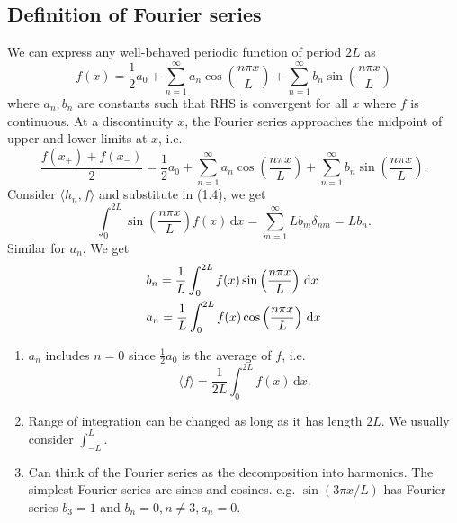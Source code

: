\documentclass[a4paper]{article}
\begin{document}
\subsection{Definition of Fourier series}
We can express any well-behaved periodic function of period $2L$ as 
\begin{equation}\label{1.eq.4:FS}
    f(x) = \frac{1}{2}a_0 + \sum_{n=1}^{\infty} a_n \cos \left( \frac{n\pi x}{L} \right)+ \sum_{n=1}^{\infty} b_n \sin \left( \frac{n\pi x}{L} \right)
\end{equation}
where $a_n,b_n$ are constants such that RHS is convergent for all $x$ where $f$ is continuous. At a discontinuity $x$, the Fourier series approaches the midpoint of upper and lower limits at $x$, i.e. 
\[
    \frac{f(x_+)+f(x_-)}{2} = \frac{1}{2}a_0 + \sum_{n=1}^{\infty} a_n \cos \left( \frac{n\pi x}{L} \right)+ \sum_{n=1}^{\infty} b_n \sin \left( \frac{n\pi x}{L} \right).
\]
Consider $ \langle h_n,f \rangle  $ and substitute in (1.4), we get 
\[
    \int_{0}^{2L} \sin \left( \frac{n \pi x}{L} \right) f(x) \,\mathrm{d}x = \sum_{m=1}^{\infty}Lb_m \delta_{nm} = Lb_n.
\]
Similar for $a_n$. We get
\begin{equation}
    \begin{aligned}
        &b_{n}=\frac{1}{L} \int_{0}^{2 L} f(x) \sin \left(\frac{n \pi x}{L}\right)\, \mathrm{d} x\\ &a_n = \frac{1}{L}\int_{0}^{2L} f(x) \cos \left( \frac{n \pi x}{L} \right) \,\mathrm{d}x
    \end{aligned}
\end{equation}
\begin{note}
    \begin{enumerate}
        \item $a_n$ includes $n=0$ since $ \frac{1}{2}a_0 $ is the average of $f$, i.e.
        \[
            \langle f \rangle = \frac{1}{2L}\int_{0}^{2L} f(x) \,\mathrm{d}x.
        \]
        \item Range of integration can be changed as long as it has length $2L$. We usually consider $ \int_{-L}^{L} $.
        \item Can think of the Fourier series as the decomposition into harmonics. The simplest Fourier series are sines and cosines. e.g. $ \sin (3 \pi x/ L) $ has Fourier series $b_3=1$ and $ b_n=0,n\neq 3 ,a_n=0$.
    \end{enumerate}
\end{note}
\end{document}
